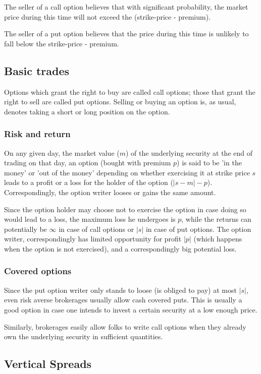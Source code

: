 \documentclass[oneside, article]{memoir}
\begin{document}
The seller of a call option believes that with significant probability, the market price during this time will not exceed the (strike-price - premium).

The seller of a put option believes that the price during this time is unlikely to fall below the strike-price - premium. 

\subsection{Basic trades}
Options which grant the right to buy are called call options; those that grant the right to sell are called put options. Selling or buying an option is, as usual, denotes taking a short or long position on the option.

\subsubsection{Risk and return}
On any given day, the market value ($m$) of the underlying security at the end of trading on that day, an option (bought with premium $p$) is said to be 'in the money' or 'out of the money' depending on whether exercising it at strike price $s$ leads to a profit or a loss for the holder of the option ($|s-m|-p$). Correspondingly, the option writer looses or gains the same amount.

Since the option holder may choose not to exercise the option in case doing so would lead to a loss, the maximum loss he undergoes is $p$, while the returns can potentially be $\infty$ in case of call options or $|s|$ in case of put options. The option writer, correspondingly has limited opportunity for profit $|p|$ (which happens when the option is not exercised), and a correspondingly big potential loss.

\subsubsection{Covered options}
Since the put option writer only stands to loose (is obliged to pay) at most $|s|$, even risk averse brokerages usually allow cash covered puts. This is usually a good option in case one intends to invest a certain security at a low enough price.

Similarly, brokerages easily allow folks to write call options when they already own the underlying security in sufficient quantities.

\subsection{Vertical Spreads}
\end{document}
